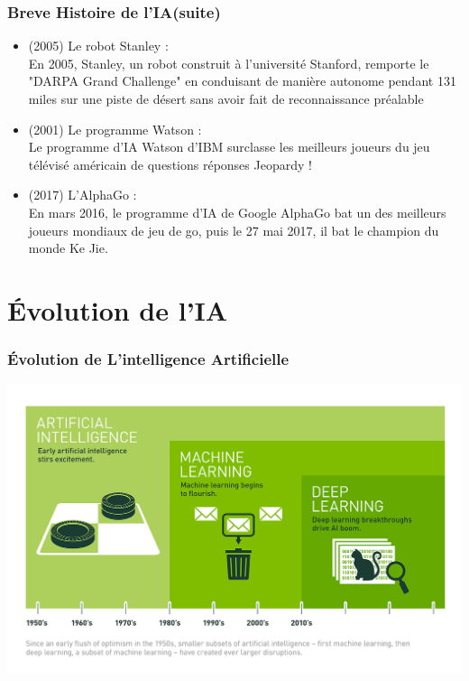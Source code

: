 \documentclass{beamer}
\begin{document}
	\begin{frame}
	\frametitle{Breve Histoire de l'IA(suite)}
	\begin{itemize}
		\itemsep1em
		\item (2005) Le robot Stanley :\\
		 En 2005, Stanley, un robot construit à l’université Stanford, remporte le "DARPA Grand Challenge" en conduisant de manière autonome pendant 131 miles sur une piste de désert sans avoir fait de reconnaissance préalable
		 
		 \item (2001) Le programme Watson :\\
		 Le programme d’IA Watson d’IBM surclasse les meilleurs joueurs du jeu télévisé américain de questions réponses Jeopardy !

		 \item (2017) L’AlphaGo :\\
		 En mars 2016, le programme d’IA de Google AlphaGo bat un des meilleurs joueurs mondiaux de jeu de go, puis le 27 mai 2017, il bat le champion du monde Ke Jie.

	\end{itemize}
	\end{frame}
	
	
	\section{Évolution de l'IA}
	\begin{frame}
	\frametitle{Évolution de L'intelligence  Artificielle}
	
	\centerline{\includegraphics{evolution.png}}
	
	\end{frame}
	
\end{document}
